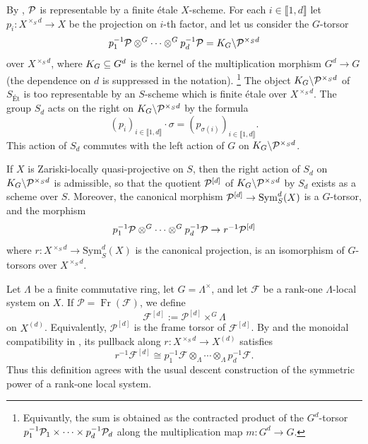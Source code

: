 By , $\mathcal{P}$ is representable by a finite étale $X$-scheme.
For each $i \in  \llbracket 1, d \rrbracket$ let $p_i : X^{\times_S d} \to X$ be the projection on $i$-th factor, and let us consider the $G$-torsor
\[
p_1^{-1}\mathcal{P} \otimes^G \cdots \otimes^G p_d^{-1}\mathcal{P} = K_{G} \backslash \mathcal{P}^{\times_S d}
\]
over $X^{\times_S d}$, where $K_{G} \subseteq G^d$ is the kernel of the multiplication morphism $G^d \to G$ (the dependence on $d$ is suppressed in the notation).
\footnote{
    Equivantly, the sum is obtained as the contracted product of the $G^d$-torsor $p_1^{-1}\mathcal{P}_1 \times \dots \times p_d^{-1}\mathcal{P}_d$ along the multiplication map
$m: G^d \to G$. }
The object $K_{G} \backslash \mathcal{P}^{\times_S d}$ of $S_{\text{Ét}}$ is too representable by an $S$-scheme which is finite étale over $X^{\times_S d}$.
The group ${S}_d$ acts on the right on $K_{G} \backslash \mathcal{P}^{\times_S d}$ by the formula
\[
(p_i)_{i \in \llbracket 1, d \rrbracket} \cdot \sigma = (p_{\sigma(i)})_{i \in \llbracket 1, d \rrbracket}.
\]
This action of ${S}_d$ commutes with the left action of $G$ on $K_{G} \backslash \mathcal{P}^{\times_S d}$.

\medskip

\begin{prop}\label{prop:symmetric_power_torsor}
If $X$ is Zariski-locally quasi-projective on $S$, then the right action of ${S}_d$ on $K_{G} \backslash \mathcal{P}^{\times_S d}$ is admissible,
so that the quotient $\mathcal{P}^{[d]}$ of $K_{G} \backslash \mathcal{P}^{\times_S d}$ by ${S}_d$ exists as a scheme over $S$.
Moreover, the canonical morphism $\mathcal{P}^{[d]} \to \mathrm{Sym}_S^d(X)$ is a $G$-torsor, 
and the morphism
\[
p_1^{-1}\mathcal{P} \otimes^G \cdots \otimes^G p_d^{-1}\mathcal{P} \to r^{-1}\mathcal{P}^{[d]}
\]
where $r : X^{\times_S d} \to \mathrm{Sym}_S^d(X)$ is the canonical projection, is an isomorphism of $G$-torsors over $X^{\times_S d}$.
\end{prop}

\begin{definition}
\label{definition:symmetric_power_local_system}
Let $\Lambda$ be a finite commutative ring, let $G=\Lambda^\times$, and let
$\mathcal{F}$ be a rank-one $\Lambda$-local system on $X$. If
$\mathcal{P}=\operatorname{Fr}(\mathcal{F})$, we define
\[
\mathcal{F}^{[d]}:=\mathcal{P}^{[d]}\times^G\Lambda
\]
on $X^{(d)}$. Equivalently, $\mathcal{P}^{[d]}$ is the frame torsor of
$\mathcal{F}^{[d]}$. By  and the monoidal
compatibility in , its pullback along
$r:X^{\times_S d}\to X^{(d)}$ satisfies
\[
r^{-1}\mathcal{F}^{[d]}
\cong p_1^{-1}\mathcal{F}\otimes_\Lambda\cdots\otimes_\Lambda
p_d^{-1}\mathcal{F}.
\]
Thus this definition agrees with the usual descent construction of the
symmetric power of a rank-one local system.
\end{definition}

